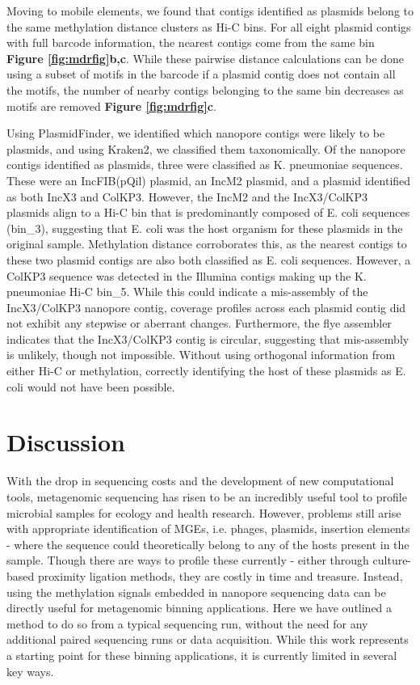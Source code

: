 Moving to mobile elements, we found that contigs identified as plasmids belong to the same methylation distance clusters as Hi-C bins.  For all eight plasmid contigs with full barcode information,  the nearest contigs come from the same bin {\bf Figure \ref{fig:mdrfig}b,c}. While these pairwise distance calculations can be done using a subset of motifs in the barcode if a plasmid contig does not contain all the motifs, the number of nearby contigs belonging to the same bin decreases as motifs are removed {\bf Figure \ref{fig:mdrfig}c}.

Using PlasmidFinder, we identified which nanopore contigs were likely to be plasmids, and using Kraken2, we classified them taxonomically. Of the nanopore contigs identified as plasmids, three were classified as K. pneumoniae sequences. These were an IncFIB(pQil) plasmid, an IncM2 plasmid, and a plasmid identified as both IncX3 and ColKP3. However, the IncM2 and the IncX3/ColKP3 plasmids align to a Hi-C bin that is predominantly composed of E. coli sequences (bin\_3), suggesting that E. coli was the host organism for these plasmids in the original sample. Methylation distance corroborates this, as the nearest contigs to these two plasmid contigs are also both classified as E. coli sequences. However, a ColKP3 sequence was detected in the Illumina contigs making up the K. pneumoniae Hi-C bin\_5. While this could indicate a mis-assembly of the IncX3/ColKP3 nanopore contig, coverage profiles across each plasmid contig did not exhibit any stepwise or aberrant changes. Furthermore, the flye assembler indicates that the IncX3/ColKP3 contig is circular, suggesting that mis-assembly is unlikely, though not impossible. Without using orthogonal information from either Hi-C or methylation, correctly identifying the host of these plasmids as E. coli would not have been possible.

\section{Discussion}
\label{sec:discuss}

With the drop in sequencing costs and the development of new computational tools, metagenomic sequencing has risen to be an incredibly useful tool to profile microbial samples for ecology and health research. However, problems still arise with appropriate identification of MGEs, i.e. phages, plasmids, insertion elements - where the sequence could theoretically belong to any of the hosts present in the sample. Though there are ways to profile these currently - either through culture-based proximity ligation methods, they are costly in time and treasure. Instead, using the methylation signals embedded in nanopore sequencing data can be directly useful for metagenomic binning applications. Here we have outlined a method to do so from a typical sequencing run, without the need for any additional paired sequencing runs or data acquisition. While this work represents a starting point for these binning applications, it is currently limited in several key ways.

